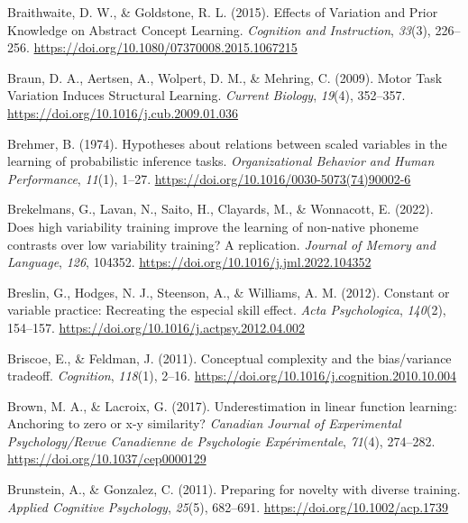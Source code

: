 \documentclass[
  11pt,
  letterpaper,
]{article}
\newlength{\cslhangindent}
\newenvironment{CSLReferences}[2] %
 {\begin{list}{}{%
  \setlength{\itemindent}{0pt}
  \setlength{\leftmargin}{0pt}
  \setlength{\parsep}{0pt}
  \ifodd #1
   \setlength{\leftmargin}{\cslhangindent}
   \setlength{\itemindent}{-1\cslhangindent}
  \fi
  \setlength{\itemsep}{#2\baselineskip}}}
 {\end{list}}
\begin{document}
\begin{CSLReferences}{1}{0}
Braithwaite, D. W., \& Goldstone, R. L. (2015). Effects of {Variation}
and {Prior Knowledge} on {Abstract Concept Learning}. \emph{Cognition
and Instruction}, \emph{33}(3), 226--256.
\url{https://doi.org/10.1080/07370008.2015.1067215}

Braun, D. A., Aertsen, A., Wolpert, D. M., \& Mehring, C. (2009). Motor
{Task Variation Induces Structural Learning}. \emph{Current Biology},
\emph{19}(4), 352--357. \url{https://doi.org/10.1016/j.cub.2009.01.036}

Brehmer, B. (1974). Hypotheses about relations between scaled variables
in the learning of probabilistic inference tasks. \emph{Organizational
Behavior and Human Performance}, \emph{11}(1), 1--27.
\url{https://doi.org/10.1016/0030-5073(74)90002-6}

Brekelmans, G., Lavan, N., Saito, H., Clayards, M., \& Wonnacott, E.
(2022). Does high variability training improve the learning of
non-native phoneme contrasts over low variability training? {A}
replication. \emph{Journal of Memory and Language}, \emph{126}, 104352.
\url{https://doi.org/10.1016/j.jml.2022.104352}

Breslin, G., Hodges, N. J., Steenson, A., \& Williams, A. M. (2012).
Constant or variable practice: {Recreating} the especial skill effect.
\emph{Acta Psychologica}, \emph{140}(2), 154--157.
\url{https://doi.org/10.1016/j.actpsy.2012.04.002}

Briscoe, E., \& Feldman, J. (2011). Conceptual complexity and the
bias/variance tradeoff. \emph{Cognition}, \emph{118}(1), 2--16.
\url{https://doi.org/10.1016/j.cognition.2010.10.004}

Brown, M. A., \& Lacroix, G. (2017). Underestimation in linear function
learning: {Anchoring} to zero or x-y similarity? \emph{Canadian Journal
of Experimental Psychology/Revue Canadienne de Psychologie
Exp{é}rimentale}, \emph{71}(4), 274--282.
\url{https://doi.org/10.1037/cep0000129}

Brunstein, A., \& Gonzalez, C. (2011). Preparing for novelty with
diverse training. \emph{Applied Cognitive Psychology}, \emph{25}(5),
682--691. \url{https://doi.org/10.1002/acp.1739}


\end{CSLReferences}
\end{document}
